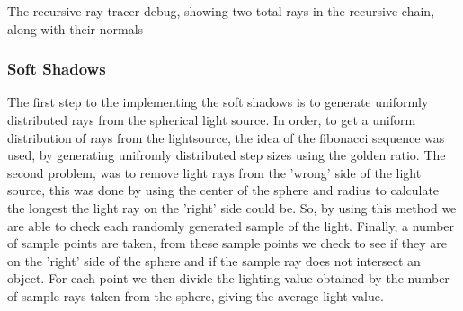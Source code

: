 \documentclass{article}
\begin{document}
\begin{center}
        The recursive ray tracer debug, showing two total rays in the recursive chain, along with their normals
    \end{center}
    \subsubsection{Soft Shadows}
    The first step to the implementing the soft shadows is to generate uniformly distributed rays from the spherical light source. 
    In order, to get a uniform distribution of rays from the lightsource, the idea of the fibonacci sequence was used, by generating unifromly distributed 
    step sizes using the golden ratio. The second problem, was to remove light rays
    from the 'wrong' side of the light source, this was done by using the center of the sphere and radius to calculate the longest the light ray on the 'right' side could be.
    So, by using this method we are able to check each randomly generated sample of the light. Finally, a number of sample points are taken, from these sample points we check to see if they are on the 'right' side of the sphere
    and if the sample ray does not intersect an object. For each point we then divide the lighting value obtained by the number of sample rays taken from the sphere, giving the average light value. 
\end{document}
